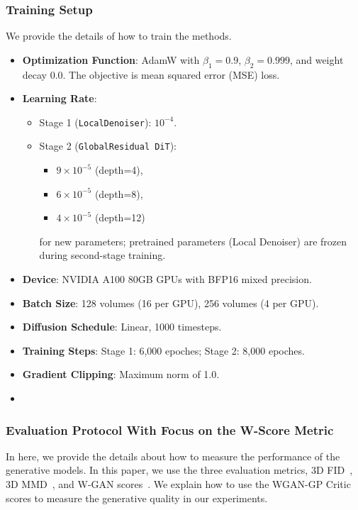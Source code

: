 \subsubsection{Training Setup}
We provide the details of how to train the methods.
\begin{itemize}
    \item \textbf{Optimization Function}: AdamW  with $\beta_1=0.9$, $\beta_2=0.999$, and weight decay 0.0. The objective is mean squared error (MSE) loss.
    \item \textbf{Learning Rate}:
    \begin{itemize}
        \item Stage 1 (\texttt{LocalDenoiser}): $10^{-4}$.
        \item Stage 2 (\texttt{GlobalResidual DiT}): 
        \begin{itemize}
        \item $9 \times 10^{-5}$ (depth=4), 
        \item $6 \times 10^{-5}$ (depth=8), 
        \item $4 \times 10^{-5}$ (depth=12) 
        \end{itemize}
        for new parameters; pretrained parameters (Local Denoiser) are frozen during second-stage training.
    \end{itemize}
    \item \textbf{Device}: NVIDIA A100 80GB GPUs with BFP16 mixed precision.
    \item \textbf{Batch Size}: 128 volumes (16 per GPU), 256 volumes (4 per GPU).
    \item \textbf{Diffusion Schedule}: Linear, 1000 timesteps.
    \item \textbf{Training Steps}: Stage 1: 6,000 epoches; Stage 2: 8,000 epoches.
    \item \textbf{Gradient Clipping}: Maximum norm of 1.0.
    \item {}
\end{itemize}
\subsubsection{Evaluation Protocol With Focus on the W-Score Metric}
\label{ap:eval}
In here, we provide the details about how to measure the performance of the generative models. In this paper, we use the three evaluation metrics, 3D FID~\citep{friedrich2024wdm}, 3D MMD~\citep{sun2022hierarchical}, and W-GAN scores~\citep{zhang2025tcam}. We explain how to use the WGAN-GP Critic scores to measure the generative quality in our experiments.
